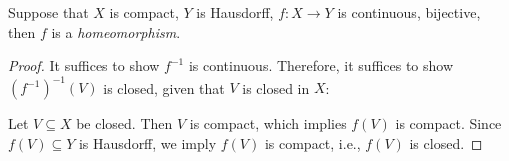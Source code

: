\begin{theorem}\label{The:5:3}
Suppose that $X$ is compact, $Y$ is Hausdorff, $f:X\to Y$ is continuous, bijective, then $f$ is a \emph{homeomorphism}.
\end{theorem}
\begin{proof}
It suffices to show $f^{-1}$ is continuous.
Therefore, it suffices to show $(f^{-1})^{-1}(V)$ is closed, given that $V$ is closed in $X$:

Let $V\subseteq X$ be closed. Then $V$ is compact, which implies $f(V)$ is compact. 
Since $f(V)\subseteq Y$ is Hausdorff, we imply $f(V)$ is compact, i.e., $f(V)$ is closed.
\end{proof}


















